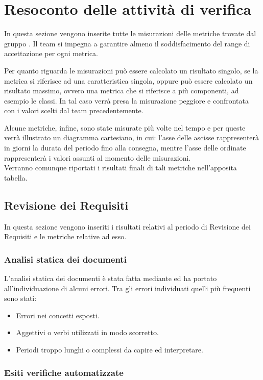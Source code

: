 \section{Resoconto delle attività di verifica}

In questa sezione vengono inserite tutte le misurazioni delle metriche trovate dal gruppo \gruppo.
Il team si impegna a garantire almeno il soddisfacimento del range di accettazione per ogni metrica.

Per quanto riguarda le misurazioni può essere calcolato un risultato singolo, se la metrica si riferisce ad una caratteristica singola, oppure può essere calcolato un risultato massimo, ovvero una metrica che si riferisce a più componenti, ad esempio le classi. In tal caso verrà presa la misurazione peggiore e confrontata con i valori scelti dal team precedentemente.

Alcune metriche, infine, sono state misurate più volte nel tempo e per queste verrà illustrato un diagramma cartesiano, in cui: l'asse delle ascisse rappresenterà in giorni la durata del periodo fino alla consegna, mentre l'asse delle ordinate rappresenterà i valori assunti al momento delle misurazioni. \\
Verranno comunque riportati i risultati finali di tali metriche nell'apposita tabella.


\subsection{Revisione dei Requisiti}
In questa sezione vengono inseriti i risultati relativi al periodo di Revisione dei Requisiti e le metriche relative ad esso.

\subsubsection{Analisi statica dei documenti}
L'analisi statica dei documenti è stata fatta mediante  ed ha portato all'individuazione di alcuni errori. Tra gli errori individuati quelli più frequenti sono stati:
		\begin{itemize}
			\item Errori nei concetti esposti.
			\item Aggettivi o verbi utilizzati in modo scorretto.
			\item Periodi troppo lunghi o complessi da capire ed interpretare.
		\end{itemize}

\subsubsection{Esiti verifiche automatizzate}
		
